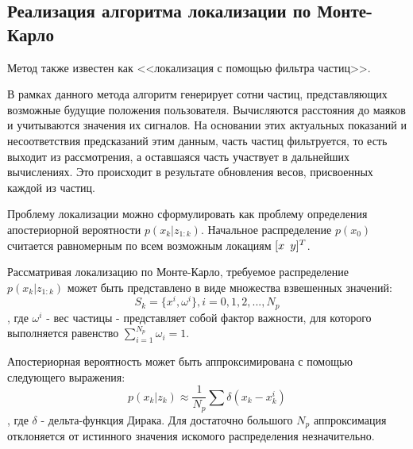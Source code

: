 \subsection{Реализация алгоритма локализации по Монте-Карло}

Метод также известен как <<локализация с помощью фильтра частиц>>.

В рамках данного метода алгоритм генерирует сотни частиц, представляющих возможные будущие положения пользователя. Вычисляются расстояния до маяков и учитываются значения их сигналов. На основании этих актуальных показаний и несоответствия предсказаний этим данным, часть частиц фильтруется, то есть выходит из рассмотрения, а оставшаяся часть участвует в дальнейших вычислениях. Это происходит в результате обновления весов, присвоенных каждой из частиц.

Проблему локализации можно сформулировать как проблему определения апостериорной вероятности  $p(x_k | z_{1:k})$. Начальное распределение $p(x_0)$ считается равномерным по всем возможным локациям $[x \enskip y]^T$.

Рассматривая локализацию по Монте-Карло, требуемое распределение \\$p(x_k | z_{1:k})$ может быть представлено в виде множества взвешенных значений:
\[
    S_k = \{ x^i, \omega^i \}, i = 0,1,2,...,N_p
\]
, где $\omega^i$ - вес частицы - представляет собой фактор важности, для которого выполняется равенство $\sum_{i=1}^{N_p} \omega_i = 1$. 

Апостериорная вероятность может быть аппроксимирована с помощью следующего выражения:
\[
    p(x_k | z_k) \approx \frac{1}{N_p} \sum \delta (x_k - x_k^i)
\]
, где $\delta$ - дельта-функция Дирака. Для достаточно большого $N_p$ аппроксимация отклоняется от истинного значения искомого распределения незначительно.

